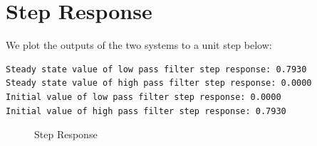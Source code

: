 \documentclass{article}
\begin{document}
\section*{Step Response}
We plot the outputs of the two systems to a unit step below:

\begin{verbatim}
Steady state value of low pass filter step response: 0.7930
Steady state value of high pass filter step response: 0.0000
Initial value of low pass filter step response: 0.0000
Initial value of high pass filter step response: 0.7930
\end{verbatim}

\begin{figure}%
    \centering
    \qquad
    \caption{Step Response}%
    \label{Figure 4}
\end{figure}
		
\end{document}
